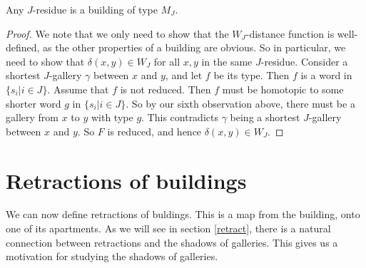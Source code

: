 \documentclass[11pt]{article}
\begin{document}
\begin{theorem}
    Any $J$-residue is a building of type $M_J$. 
\end{theorem}

\begin{proof}
    We note that we only need to show that the $W_J$-distance function is well-defined, as the other properties of a building are obvious. So in particular, we need to show that $\delta(x,y)\in W_J$ for all $x,y$ in the same $J$-residue. Consider a shortest $J$-gallery $\gamma$ between $x$ and $y$, and let $f$ be its type. Then $f$ is a word in $\{s_i|i\in J\}$. Assume that $f$ is not reduced. Then $f$ must be homotopic to some shorter word $g$ in $\{s_i|i\in J\}$. So by our sixth observation above, there must be a gallery from $x$ to $y$ with type $g$. This contradicts $\gamma$ being a shortest $J$-gallery between $x$ and $y$. So $F$ is reduced, and hence $\delta(x,y)\in W_J$. 
\end{proof}







\section{Retractions of buildings}


We can now define retractions of buldings. This is a map from the building, onto one of its apartments. As we will see in section \ref{retract}, there is a natural connection between retractions and the shadows of galleries. This gives us a motivation for studying the shadows of galleries. 
\end{document}
